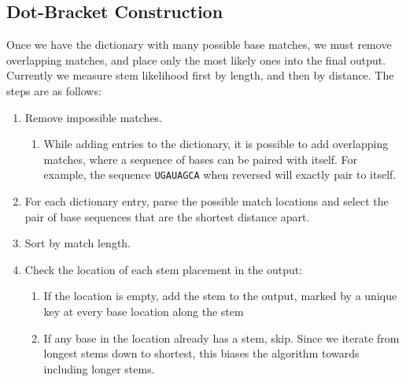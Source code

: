 \documentclass[sigconf]{acmart}
\begin{document}
\subsection{Dot-Bracket Construction}
Once we have the dictionary with many possible base matches, we must remove overlapping matches, and place only the most likely ones into the final output. Currently we measure stem likelihood first by length, and then by distance. The steps are as follows:
\begin{enumerate}
\item Remove impossible matches.
	\begin{enumerate}
	\item While adding entries to the dictionary, it is possible to add overlapping matches, where a sequence of bases can be paired with itself. For example, the sequence \texttt{UGAUAGCA} when reversed will exactly pair to itself. 
	\end{enumerate}
\item For each dictionary entry, parse the possible match locations and select the pair of base sequences that are the shortest distance apart.
\item Sort by match length.
\item Check the location of each stem placement in the output:
	\begin{enumerate}
	\item If the location is empty, add the stem to the output, marked by a unique key at every base location along the stem
	\item If any base in the location already has a stem, skip. Since we iterate from longest stems down to shortest, this biases the algorithm towards including longer stems.
	\end{enumerate}
\end{enumerate}
\end{document}
